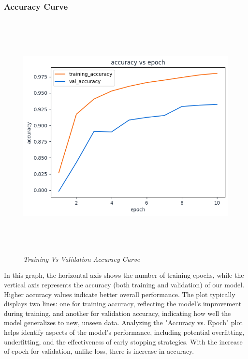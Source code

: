 \subsubsection{Accuracy Curve}
\begin{figure}[ht]
    \centering
    \includegraphics[width=5in, height =5in ]{img/accuracyVsepoch.png}
    \caption{\textit{Training Vs Validation Accuracy Curve }}
\end{figure}
In this graph, the horizontal axis shows the number of training epochs, while the vertical axis represents the accuracy (both training and validation) of our model. Higher accuracy values indicate better overall performance. The plot typically displays two lines: one for training accuracy, reflecting the model's improvement during training, and another for validation accuracy, indicating how well the model generalizes to new, unseen data. Analyzing the "Accuracy vs. Epoch" plot helps identify aspects of the model's performance, including potential overfitting, underfitting, and the effectiveness of early stopping strategies.
With the increase of epoch for validation, unlike loss, there is increase in accuracy.
\newpage
